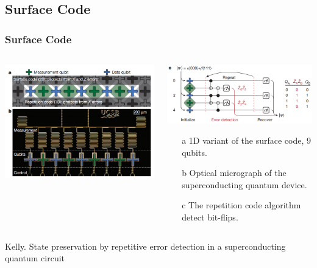 \documentclass[aspectratio=169,10pt]{beamer}
\begin{document}
\subsection{Surface Code}
\begin{frame}
    \frametitle{Surface Code}
    \begin{columns}
        \begin{column}{0.5\textwidth}
            \centering
            \includegraphics[width=\columnwidth]{figure/surface.png}
        \end{column}
        \begin{column}{0.5\textwidth}
            \centering
            \includegraphics[width=\columnwidth]{figure/surface1.png}
            \begin{enumerate}
                \item[a] 1D variant of the surface code, 9 qubits.
                \item[b] Optical micrograph of the superconducting quantum device. 
                \item[c] The repetition code algorithm detect bit-flips.
            \end{enumerate}
        \end{column}
    \end{columns}
\tiny{Kelly. State preservation by repetitive error detection in a superconducting quantum circuit}
\end{frame}
\end{document}
